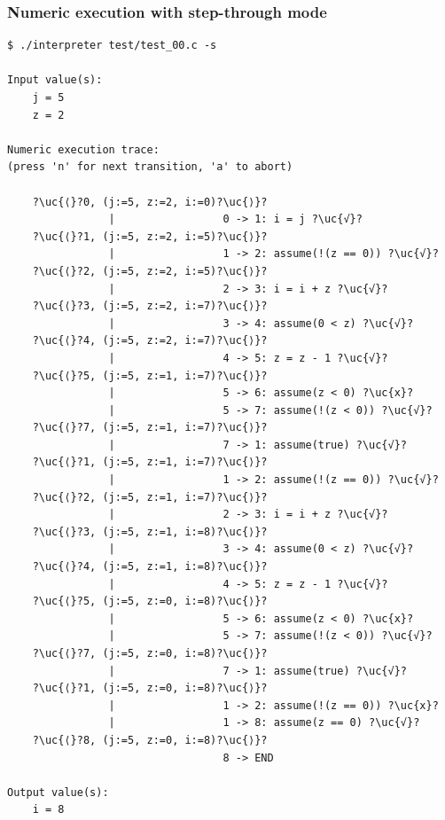\documentclass[english,a4paper,oneside]{article}%
\newcommand{\uc}[1]{ \scriptsize{\texttt{#1}} }
\begin{document}
\subsubsection{Numeric execution with step-through mode}
\begin{scriptsize}
\begin{lstlisting}
$ ./interpreter test/test_00.c -s

Input value(s):
	j = 5
	z = 2

Numeric execution trace:
(press 'n' for next transition, 'a' to abort)

	?\uc{⟨}?0, (j:=5, z:=2, i:=0)?\uc{⟩}?
	            |                 0 -> 1: i = j ?\uc{√}?
	?\uc{⟨}?1, (j:=5, z:=2, i:=5)?\uc{⟩}?
	            |                 1 -> 2: assume(!(z == 0)) ?\uc{√}?
	?\uc{⟨}?2, (j:=5, z:=2, i:=5)?\uc{⟩}?
	            |                 2 -> 3: i = i + z ?\uc{√}?
	?\uc{⟨}?3, (j:=5, z:=2, i:=7)?\uc{⟩}?
	            |                 3 -> 4: assume(0 < z) ?\uc{√}?
	?\uc{⟨}?4, (j:=5, z:=2, i:=7)?\uc{⟩}?
	            |                 4 -> 5: z = z - 1 ?\uc{√}?
	?\uc{⟨}?5, (j:=5, z:=1, i:=7)?\uc{⟩}?
	            |                 5 -> 6: assume(z < 0) ?\uc{x}?
	            |                 5 -> 7: assume(!(z < 0)) ?\uc{√}?
	?\uc{⟨}?7, (j:=5, z:=1, i:=7)?\uc{⟩}?
	            |                 7 -> 1: assume(true) ?\uc{√}?
	?\uc{⟨}?1, (j:=5, z:=1, i:=7)?\uc{⟩}?
	            |                 1 -> 2: assume(!(z == 0)) ?\uc{√}?
	?\uc{⟨}?2, (j:=5, z:=1, i:=7)?\uc{⟩}?
	            |                 2 -> 3: i = i + z ?\uc{√}?
	?\uc{⟨}?3, (j:=5, z:=1, i:=8)?\uc{⟩}?
	            |                 3 -> 4: assume(0 < z) ?\uc{√}?
	?\uc{⟨}?4, (j:=5, z:=1, i:=8)?\uc{⟩}?
	            |                 4 -> 5: z = z - 1 ?\uc{√}?
	?\uc{⟨}?5, (j:=5, z:=0, i:=8)?\uc{⟩}?
	            |                 5 -> 6: assume(z < 0) ?\uc{x}?
	            |                 5 -> 7: assume(!(z < 0)) ?\uc{√}?
	?\uc{⟨}?7, (j:=5, z:=0, i:=8)?\uc{⟩}?
	            |                 7 -> 1: assume(true) ?\uc{√}?
	?\uc{⟨}?1, (j:=5, z:=0, i:=8)?\uc{⟩}?
	            |                 1 -> 2: assume(!(z == 0)) ?\uc{x}?
	            |                 1 -> 8: assume(z == 0) ?\uc{√}?
	?\uc{⟨}?8, (j:=5, z:=0, i:=8)?\uc{⟩}?
	                              8 -> END

Output value(s):
	i = 8

\end{lstlisting}
\end{scriptsize}


\newpage
\end{document}
